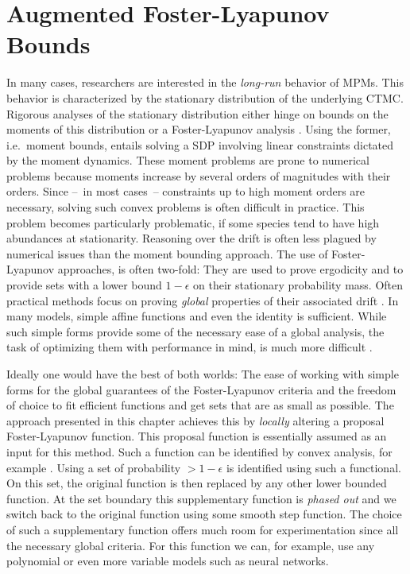 \chapter{Augmented Foster-Lyapunov Bounds}\label{ch:lyapunov}
In many cases, researchers are interested in the \emph{long-run} behavior of \acp{MPM}.
This behavior is characterized by the stationary distribution of the underlying \ac{CTMC}.
Rigorous analyses of the stationary distribution either hinge on bounds on the moments of this distribution or a Foster-Lyapunov analysis \parencite{kuntz2021stationary}.
Using the former, i.e.\ moment bounds, entails solving a \acl{SDP} involving linear constraints dictated by the moment dynamics.
These moment problems are prone to numerical problems because moments increase by several orders of magnitudes with their orders.
Since --~in most cases~-- constraints up to high moment orders are necessary, solving such convex problems is often difficult in practice.
This problem becomes particularly problematic, if some species tend to have high abundances at stationarity.
Reasoning over the drift is often less plagued by numerical issues than the moment bounding approach.
The use of Foster-Lyapunov approaches, is often two-fold: They are used to prove ergodicity and to provide sets with a lower bound $1-\epsilon$ on their stationary probability mass.
Often practical methods focus on proving \emph{global} properties of their associated drift \parencite{gupta2014scalable,spieler2014numerical}.
In many models, simple affine functions \parencite{gupta2017finite} and even the identity \parencite{spieler2014numerical} is sufficient.
While such simple forms provide some of the necessary ease of a global analysis, the task of optimizing them with performance in mind, is much more difficult \parencite{milias2014optimization}.

Ideally one would have the best of both worlds: The ease of working with simple forms for the global guarantees of the Foster-Lyapunov criteria and the freedom of choice to fit efficient functions and get sets that are as small as possible.
The approach presented in this chapter achieves this by \emph{locally} altering a proposal Foster-Lyapunov function.
This proposal function is essentially assumed as an input for this method.
Such a function can be identified by convex analysis, for example \parencite{gupta2014scalable}.
Using a set of probability $>1-\epsilon$ is identified using such a functional.
On this set, the original function is then replaced by any other lower bounded function.
At the set boundary this supplementary function is \emph{phased out} and we switch back to the original function using some smooth step function.
The choice of such a supplementary function offers much room for experimentation since all the necessary global criteria.
For this function we can, for example, use any polynomial or even more variable models such as neural networks.

